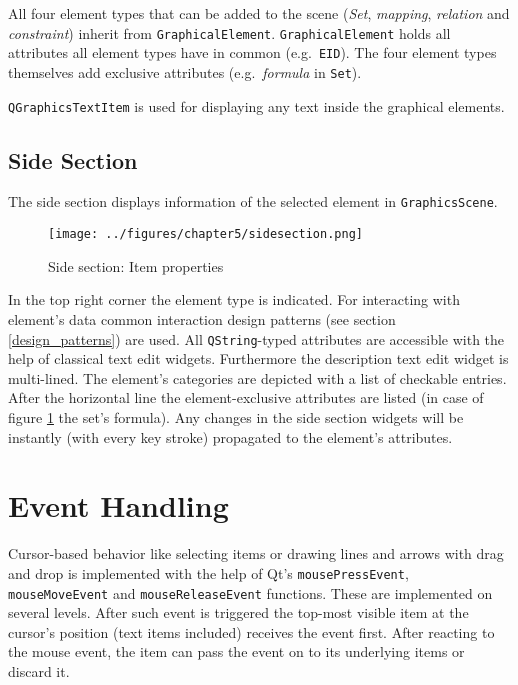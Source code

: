 \documentclass[twoside, openright, 12pt]{book}
\begin{document}
\noindent
All four element types that can be added to the scene (\textit{Set}, \textit{mapping}, \textit{relation} and \textit{constraint}) inherit from \texttt{GraphicalElement}.
\texttt{GraphicalElement} holds all attributes all element types have in common (e.g.\ \texttt{EID}).
The four element types themselves add exclusive attributes (e.g.\ \textit{formula} in \texttt{Set}).

\texttt{QGraphicsTextItem} is used for displaying any text inside the  graphical elements.



\subsection{Side Section}
\label{implementation_side_section}
The side section displays information of the selected element in \texttt{GraphicsScene}.

\begin{figure}[htb]
	\centering
	\texttt{[image: ../figures/chapter5/sidesection.png]}
	\caption{Side section: Item properties}
	\label{fig:sidesection}
\end{figure}

\noindent
In the top right corner the element type is indicated.
For interacting with element's data common interaction design patterns (see section \ref{design_patterns}) are used.
All \texttt{QString}-typed attributes are accessible with the help of classical text edit widgets.
Furthermore the description text edit widget is multi-lined.
The element's categories are depicted with a list of checkable entries.
After the horizontal line the element-exclusive attributes are listed (in case of figure \ref{fig:sidesection} the set's formula).
Any changes in the side section widgets will be instantly (with every key stroke) propagated to the element's attributes.



\section{Event Handling}
\label{implementation_events}
Cursor-based behavior like selecting items or drawing lines and arrows with drag and drop is implemented with the help of Qt's \texttt{mousePressEvent}, \texttt{mouseMoveEvent} and \texttt{mouseReleaseEvent} functions.
These are implemented on several levels.
After such event is triggered the top-most visible item at the cursor's position (text items included) receives the event first.
After reacting to the mouse event, the item can pass the event on to its underlying items or discard it.
\end{document}
